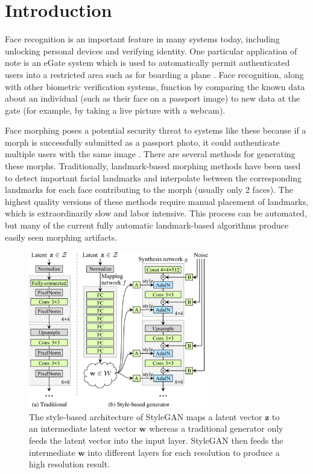 \documentclass[12pt,twocolumn]{paper}
\begin{document}
\section{Introduction}
\par
Face recognition is an important feature in many systems today, including unlocking personal devices and verifying identity. One particular application of note is an eGate system which is used to automatically permit authenticated users into a restricted area such as for boarding a plane \cite{magic-passport}. Face recognition, along with other biometric verification systems, function by comparing the known data about an individual (such as their face on a passport image) to new data at the gate (for example, by taking a live picture with a webcam).
\par
Face morphing poses a potential security threat to systems like these because if a morph is successfully submitted as a passport photo, it could authenticate multiple users with the same image \cite{magic-passport}. There are several methods for generating these morphs. Traditionally, landmark-based morphing methods have been used to detect important facial landmarks and interpolate between the corresponding landmarks for each face contributing to the morph (usually only 2 faces). The highest quality versions of these methods require manual placement of landmarks, which is extraordinarily slow and labor intensive. This process can be automated, but many of the current fully automatic landmark-based algorithms produce easily seen morphing artifacts.
\begin{figure}[t]
    \centering
    \includegraphics[width=0.7\textwidth]{sgan1_arch.png}
    \caption{The style-based architecture of StyleGAN maps a latent vector $\mathbf{z}$ to an intermediate latent vector $\mathbf{w}$ whereas a traditional generator only feeds the latent vector into the input layer. StyleGAN then feeds the intermediate $\mathbf{w}$ into different layers for each resolution to produce a high resolution result.}
    \label{sgan1_arch}
\end{figure}
\end{document}
